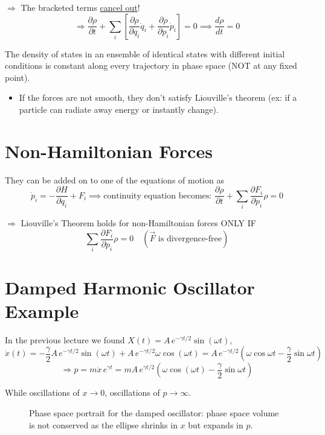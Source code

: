 $\Rightarrow$ The bracketed terms \underline{cancel out}!
\[
    \Rightarrow \frac{\partial\rho}{\partial t} + \sum_i\!\left[\frac{\partial\rho}{\partial q_i}\dot{q}_i + \frac{\partial\rho}{\partial p_i}\dot{p}_i\right] = 0 \implies \boxed{\frac{d\rho}{dt} = 0}
\]

\begin{theorem}
The density of states in an ensemble of identical states with different initial conditions is constant along every trajectory in phase space (NOT at any fixed point).
\begin{itemize}
    \item If the forces are not smooth, they don't satisfy Liouville's theorem (ex: if a particle can radiate away energy or instantly change).
\end{itemize}
\end{theorem}

\section{Non-Hamiltonian Forces}

They can be added on to one of the equations of motion as
\[
    \dot{p}_i = -\frac{\partial H}{\partial q_i} + F_i \implies \text{continuity equation becomes: } \frac{\partial\rho}{\partial t} + \sum_i\frac{\partial F_i}{\partial p_i}\rho = 0
\]

$\Rightarrow$ Liouville's Theorem holds for non-Hamiltonian forces ONLY IF
\[
    \sum_i \frac{\partial F_i}{\partial p_i}\rho = 0 \quad (\vec{F} \text{ is divergence-free})
\]

\section{Damped Harmonic Oscillator Example}

In the previous lecture we found $X(t) = A\,e^{-\gamma t/2}\sin(\omega t)$,
\[
    \dot{x}(t) = -\frac{\gamma}{2}A\,e^{-\gamma t/2}\sin(\omega t) + A\,e^{-\gamma t/2}\omega\cos(\omega t)
    = A\,e^{-\gamma t/2}\!\left(\omega\cos\omega t - \frac{\gamma}{2}\sin\omega t\right)
\]
\[
    \Rightarrow p = m\dot{x}\,e^{\gamma t} = mA\,e^{\gamma t/2}\!\left(\omega\cos(\omega t) - \frac{\gamma}{2}\sin\omega t\right)
\]

While oscillations of $x \to 0$, oscillations of $p \to \infty$.

\begin{figure}[H]
    \centering
    \caption{Phase space portrait for the damped oscillator: phase space volume is not conserved as the ellipse shrinks in $x$ but expands in $p$.}
\end{figure}

